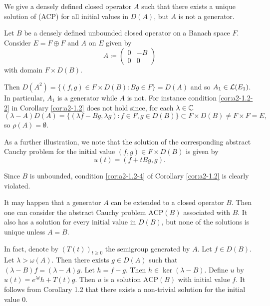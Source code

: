 \begin{example}\label{ex:a2-1.4}
We give a densely defined closed operator $ A $ such that there exists a unique solution of (ACP) for all initial values in $ D(A) $, but $ A $ is not a generator.

Let $ B $ be a densely defined unbounded closed operator on a Banach space $ F $.
Consider $ E = F \oplus F $ and $ A $ on $ E $ given by
\[
    A \coloneqq \begin{pmatrix} 0 & -B \\ 0 & 0 \end{pmatrix}
\]
with domain $ F \times D(B) $.

Then $ D(A^{2}) = \{(f,g) \in F \times D(B) \colon Bg \in F\} = D(A) $ and so $ A_{1} \in \mathcal{L}(E_{1}) $.
In particular, $ A_{1} $ is a generator while
$ A $ is not. For instance
condition \ref{cor:a2-1.2-2}   in Corollary \ref{cor:a2-1.2}   does not hold since, for each $ \lambda \in \mathbb{C} $
\[
    (\lambda-A)D(A) = \{(\lambda f-Bg,\lambda g) \colon f \in F, g \in D(B)\} \subset F \times D(B) \neq F \times F = E ,
\]
so $ \rho(A) = \emptyset $.

As a further illustration, we note that the solution of the corresponding abstract Cauchy problem for the initial value $ (f,g) \in F \times D(B) $ is given by \\
\[
u(t) = (f + tBg,g) .
\] 

Since $ B $ is unbounded, condition \ref{cor:a2-1.2-4}  of Corollary \ref{cor:a2-1.2}  is clearly violated.
\end{example}
\begin{remark*}\label{rem:a2-1.4-kgk} 
It may happen that a generator $A$ can be extended to a closed operator $B$.
Then one can consider the abstract Cauchy problem $\text{ACP}(B)$ associated with $B$.
It also has a solution for every initial value in $D(B)$, but none of the solutions is unique unless $A = B$.

In fact, denote by $(T(t))_{t \geq 0}$ the semigroup generated by $A$.
Let $f \in D(B)$.
Let $\lambda > \omega(A)$.
Then there exists $g \in D(A)$ such that $(\lambda-B)f = (\lambda-A)g$.
Let $h = f - g$.
Then $h \in \ker(\lambda-B)$.
Define $u$ by $u(t) = e^{\lambda t}h + T(t)g$.
Then $u$ is a solution $\text{ACP}(B)$ with initial value $f$.
It follows from Corollary 1.2 that there exists a non-trivial solution for the initial value $0$.
\end{remark*}
